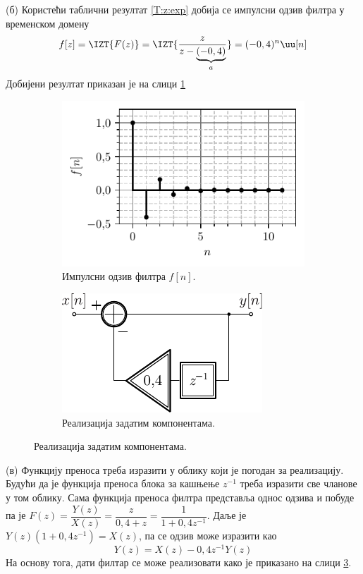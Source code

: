 (б) Користећи таблични резултат \ref{T:z:exp} добија се импулсни одзив филтра у временском домену
\begin{eqnarray}
    f[z] = \IZT{F(z)} = \IZT{\dfrac{z}{z-\underbrace{(-0,4)}_a} } = (-0,4)^n \uu[n]
\end{eqnarray}
Добијени резултат приказан је на слици \ref{fig:\ID.1}
%

\begin{figure}[b!]
    \centering
        \begin{subfigure}{0.59\textwidth}
            \centering
            \includegraphics{fig/h_equalizer.pdf}
            \caption{Импулсни одзив филтра $f[n]$.}
            \label{fig:\ID.1}
        \end{subfigure}
        \begin{subfigure}{0.39\textwidth}
            \centering
            \includegraphics{fig/equalizer_blok.pdf}
            \caption{Реализација задатим компонентама.}
            \label{fig:\ID.2}
        \end{subfigure}
    \end{figure}
%
(в) Функцију преноса треба изразити у облику који је погодан за реализацију. Будући да је функција преноса блока за кашњење
$z^{-1}$ треба изразити све чланове у том облику.
Сама функција преноса филтра представља однос одзива и побуде па је $F(z) = \dfrac{Y(z)}{X(z)} = \dfrac{z}{0,4 + z} = 
\dfrac{1}{1 + 0,4 z^{-1}}$. Даље је $Y(z) (1 + 0,4 z^{-1}) = X(z)$, па се одзив може изразити као 
\begin{equation}
    Y(z) = X(z) - 0,4 z^{-1} Y(z)
\end{equation}
На основу тога, дати филтар се може реализовати како је приказано на слици \ref{fig:\ID.2}.
